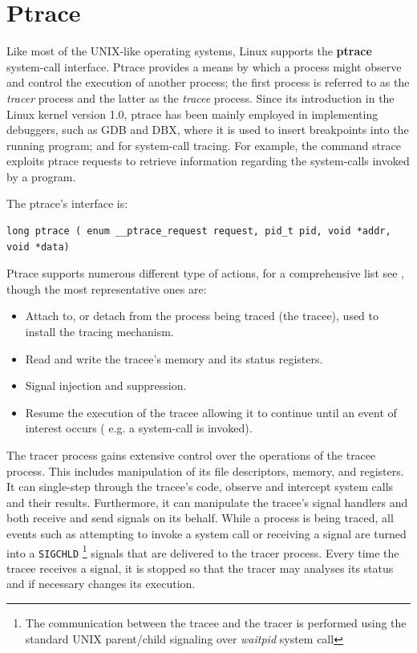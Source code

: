 \chapter{Ptrace}

Like most of the UNIX-like operating systems, Linux supports the \textbf{ptrace} system-call interface. Ptrace provides a means by which a process might observe and control the execution of another process; the first process is referred to as the \textit{tracer} process and the latter as the \textit{tracee} process. Since its introduction in the Linux kernel version 1.0,  ptrace has been mainly employed in implementing debuggers, such as GDB and DBX, where it is used to insert breakpoints into the running program; and for system-call tracing. For example, the command strace exploits ptrace requests to retrieve information regarding the system-calls invoked by a program. 

The ptrace's interface is:
\begin{center}
\begin{lstlisting}[caption={Synopsis ptrace system call}]
	long ptrace ( enum __ptrace_request request, pid_t pid, void *addr, void *data)
\end{lstlisting}
\end{center}

Ptrace supports numerous different type of actions, for a comprehensive list see  \cite{ptrace}, though the most representative ones are:

\begin{itemize}
\item Attach to, or detach from the process being traced (the tracee), used to install the tracing mechanism.  
\item Read and write the tracee's memory and its status registers.
\item Signal injection and suppression.
\item Resume the execution of the tracee allowing it to continue until 
	  an event of interest occurs ( e.g. a system-call is invoked).
\end{itemize} 

The tracer process gains extensive control over the operations of the tracee process. This includes manipulation of its file descriptors, memory, and registers. It can single-step through the tracee's code, observe and intercept system calls and their results. Furthermore, it can manipulate the tracee's signal handlers and both receive and send signals on its behalf. While a process is being traced, all events such as attempting to invoke a system call or receiving a signal are turned into a  \lstinline$SIGCHLD$ \footnote{The communication between the tracee and the tracer is performed using the standard UNIX parent/child signaling over \emph{waitpid} system call}  signals that are delivered to the tracer process. Every time the tracee receives a signal, it is stopped so that the tracer may analyses its status and if necessary changes its execution. 


